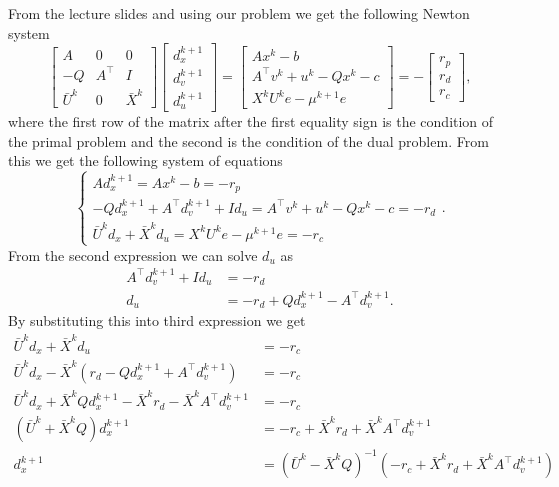 \documentclass{article}
\begin{document}
	From the lecture slides and using our problem we get the following Newton system
	\begin{equation}
		\begin{bmatrix}
			A & 0 & 0\\
			-Q & A^\top & I\\
			\bar{U}^k & 0 & \bar{X}^k
		\end{bmatrix}
		\begin{bmatrix}
			d_x^{k+1}\\
			d_v^{k+1}\\
			d_u^{k+1}
		\end{bmatrix} =
		\begin{bmatrix}
			Ax^{k}-b \\
			A^\top v^k+ u^k -Qx^k-c\\
			X^k U^k e - \mu^{k+1}e
		\end{bmatrix} = -
		\begin{bmatrix}
			r_p\\
			r_d\\
			r_c
		\end{bmatrix},
	\end{equation}
	where the first row of the matrix after the first equality sign is the condition of the primal problem and the second is the condition of the dual problem. From this we get the following system of equations
	\begin{equation}
		\begin{cases}
			Ad_x^{k+1} = Ax^{k}-b = -r_p \\
			-Qd_x^{k+1}+A^\top d_v^{k+1} + Id_u = A^\top v^k+ u^k -Qx^k-c = -r_d\\
			\bar{U}^kd_x + \bar{X}^kd_u= X^k U^k e - \mu^{k+1}e = -r_c
		\end{cases}.
	\end{equation}
	From the second expression we can solve $d_u$ as 
	\begin{align}
		A^\top d_v^{k+1} + Id_u &= -r_d\\
		d_u &= -r_d +Qd_x^{k+1}- A^\top d_v^{k+1}.
	\end{align}
	By substituting this into third expression we get
	\begin{align}
		\bar{U}^kd_x + \bar{X}^kd_u &= -r_c\\
		\bar{U}^kd_x - \bar{X}^k(r_d -Qd_x^{k+1} + A^\top d_v^{k+1}) &= -r_c\\
		\bar{U}^kd_x + \bar{X}^kQd_x^{k+1} - \bar{X}^kr_d -\bar{X}^kA^\top d_v^{k+1} &= -r_c\\
		(\bar{U}^k + \bar{X}^kQ)d_x^{k+1} &= -r_c + \bar{X}^kr_d +\bar{X}^kA^\top d_v^{k+1}\\
		d_x^{k+1} &= (\bar{U}^k - \bar{X}^kQ) ^{-1}(-r_c + \bar{X}^kr_d +\bar{X}^kA^\top d_v^{k+1}) \label{eq:d_x}
	\end{align}
\end{document}
